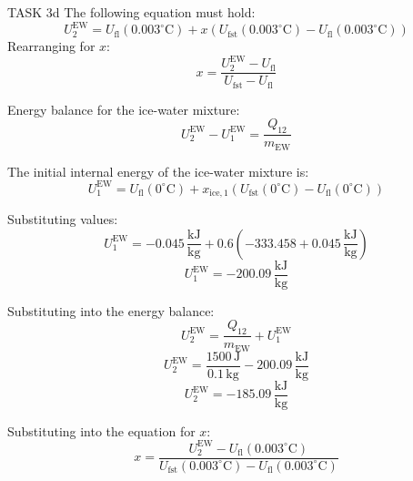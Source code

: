 TASK 3d  
The following equation must hold:  
\[
U_2^{\text{EW}} = U_{\text{fl}}(0.003^\circ\text{C}) + x \left( U_{\text{fst}}(0.003^\circ\text{C}) - U_{\text{fl}}(0.003^\circ\text{C}) \right)
\]  
Rearranging for \( x \):  
\[
x = \frac{U_2^{\text{EW}} - U_{\text{fl}}}{U_{\text{fst}} - U_{\text{fl}}}
\]  

Energy balance for the ice-water mixture:  
\[
U_2^{\text{EW}} - U_1^{\text{EW}} = \frac{Q_{12}}{m_{\text{EW}}}
\]  

The initial internal energy of the ice-water mixture is:  
\[
U_1^{\text{EW}} = U_{\text{fl}}(0^\circ\text{C}) + x_{\text{ice},1} \left( U_{\text{fst}}(0^\circ\text{C}) - U_{\text{fl}}(0^\circ\text{C}) \right)
\]  

Substituting values:  
\[
U_1^{\text{EW}} = -0.045 \, \frac{\text{kJ}}{\text{kg}} + 0.6 \left( -333.458 + 0.045 \, \frac{\text{kJ}}{\text{kg}} \right)
\]  
\[
U_1^{\text{EW}} = -200.09 \, \frac{\text{kJ}}{\text{kg}}
\]  

Substituting into the energy balance:  
\[
U_2^{\text{EW}} = \frac{Q_{12}}{m_{\text{EW}}} + U_1^{\text{EW}}
\]  
\[
U_2^{\text{EW}} = \frac{1500 \, \text{J}}{0.1 \, \text{kg}} - 200.09 \, \frac{\text{kJ}}{\text{kg}}
\]  
\[
U_2^{\text{EW}} = -185.09 \, \frac{\text{kJ}}{\text{kg}}
\]  

Substituting into the equation for \( x \):  
\[
x = \frac{U_2^{\text{EW}} - U_{\text{fl}}(0.003^\circ\text{C})}{U_{\text{fst}}(0.003^\circ\text{C}) - U_{\text{fl}}(0.003^\circ\text{C})}
\]